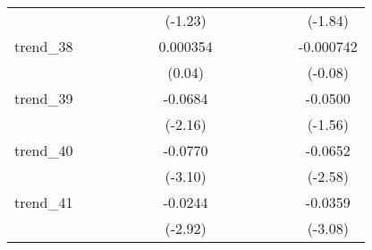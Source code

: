 {\begin{tabular}{l*{12}{c}}
            &                     &                     &                     &                     &                     &     (-1.23)         &                     &                     &                     &                     &                     &     (-1.84)         \\
[1em]
trend\_38    &                     &                     &                     &                     &                     &    0.000354         &                     &                     &                     &                     &                     &   -0.000742         \\
            &                     &                     &                     &                     &                     &      (0.04)         &                     &                     &                     &                     &                     &     (-0.08)         \\
[1em]
trend\_39    &                     &                     &                     &                     &                     &     -0.0684\sym{*}  &                     &                     &                     &                     &                     &     -0.0500         \\
            &                     &                     &                     &                     &                     &     (-2.16)         &                     &                     &                     &                     &                     &     (-1.56)         \\
[1em]
trend\_40    &                     &                     &                     &                     &                     &     -0.0770\sym{**} &                     &                     &                     &                     &                     &     -0.0652\sym{*}  \\
            &                     &                     &                     &                     &                     &     (-3.10)         &                     &                     &                     &                     &                     &     (-2.58)         \\
[1em]
trend\_41    &                     &                     &                     &                     &                     &     -0.0244\sym{**} &                     &                     &                     &                     &                     &     -0.0359\sym{**} \\
            &                     &                     &                     &                     &                     &     (-2.92)         &                     &                     &                     &                     &                     &     (-3.08)         \\

\end{tabular}}
